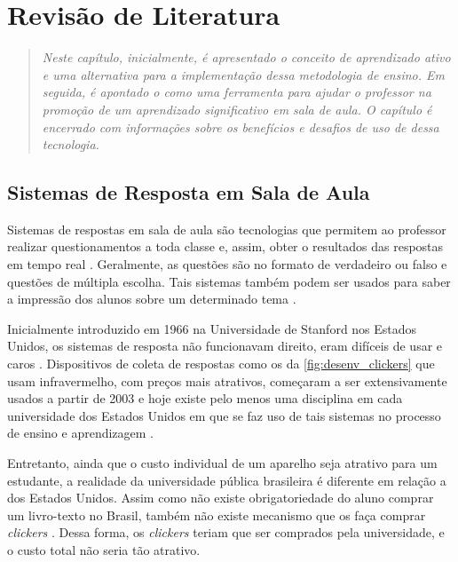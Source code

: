 \chapter{Revisão de Literatura}\label{chap:revision}
\begin{quote}\normalfont\itshape\vspace*{-2\baselineskip}
  Neste capítulo, inicialmente, é
  apresentado o conceito de aprendizado ativo e uma alternativa para a implementação dessa
  metodologia de ensino.
  Em seguida, é apontado o {\clicker} como uma
  ferramenta para ajudar o professor na promoção de um aprendizado significativo  em
  sala de aula. O capítulo é encerrado com informações sobre os benefícios e desafios de uso de dessa tecnologia.
\end{quote}


\section{Sistemas de Resposta em Sala de Aula}
\label{section:sistemas_de_resposta}

Sistemas de respostas em sala de aula são tecnologias que permitem ao professor
realizar questionamentos a toda classe e, assim, obter o resultados das respostas
em tempo real \cite{Kay2009}. Geralmente, as questões são no formato de verdadeiro ou
falso e questões de múltipla escolha. Tais sistemas também podem ser usados para
saber a impressão dos alunos sobre um determinado tema \cite{Fies2006}.

Inicialmente introduzido em 1966 na Universidade de Stanford nos Estados Unidos, os sistemas
de resposta não funcionavam direito, eram difíceis de usar e caros \cite{Kay2009}. Dispositivos
de coleta de respostas como os da \autoref{fig:desenv_clickers} que usam infravermelho, com preços mais
atrativos, começaram a ser extensivamente usados a partir de 2003 e hoje existe pelo menos
uma disciplina em cada universidade dos Estados Unidos em que se faz uso de tais sistemas
no processo de ensino e aprendizagem \cite{Abrahamson2014}.

Entretanto, ainda que o custo individual de um aparelho seja atrativo para um
estudante, a realidade da universidade pública brasileira é diferente em relação
a dos Estados Unidos. Assim como não existe obrigatoriedade do aluno comprar um
livro-texto no Brasil, também não existe mecanismo que os faça
comprar \textit{clickers} \cite{GerdKortemeyerEmersonCruz2011}. Dessa forma, os \textit{clickers}
teriam que ser comprados pela universidade, e o custo total não seria tão atrativo.

